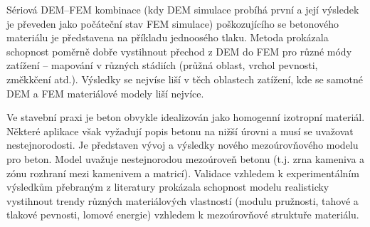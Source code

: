 {%
Sériová DEM--FEM kombinace (kdy DEM simulace probíhá první a její výsledek je převeden jako počáteční stav FEM simulace) poškozujícího se betonového materiálu je představena na příkladu jednoosého tlaku.
Metoda prokázala schopnost poměrně dobře vystihnout přechod z DEM do FEM pro různé módy zatížení -- mapování v různých stádiích (průžná oblast, vrchol pevnosti, změkkčení atd.).
Výsledky se nejvíse liší v těch oblastech zatížení, kde se samotné DEM a FEM materiálové modely liší nejvíce.

Ve stavební praxi je beton obvykle idealizován jako homogenní izotropní materiál.
Některé aplikace však vyžadují popis betonu na nižší úrovni a musí se uvažovat nestejnorodosti.
Je představen vývoj a výsledky nového mezoúrovňového modelu pro beton.
Model uvažuje nestejnorodou mezoúroveň betonu (t.j. zrna kameniva a zónu rozhraní mezi kamenivem a matricí).
Validace vzhledem k experimentálním výsledkům přebraným z literatury prokázala schopnost modelu realisticky vystihnout trendy různých materiálových vlastností (modulu pružnosti, tahové a tlakové pevnosti, lomové energie) vzhledem k mezo\-úrovňové struktuře materiálu.
}
